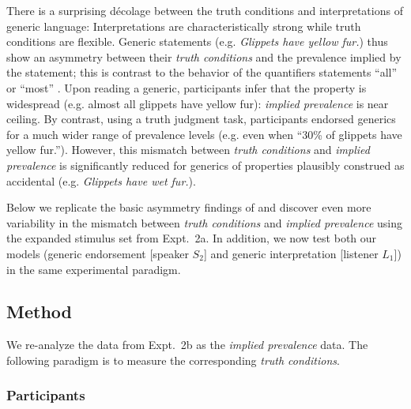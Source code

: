 \documentclass[12pt,letterpaper]{article}
\begin{document}
There is a surprising d\'{e}colage between the truth conditions and interpretations of generic language: Interpretations are characteristically strong while truth conditions are flexible. 
Generic statements (e.g. \emph{Glippets have yellow fur.}) thus show an asymmetry between their \emph{truth conditions} and the prevalence implied by the statement; this is contrast to the behavior of the quantifiers statements ``all'' or ``most'' \cite{Cimpian2010}. 
Upon reading a generic, participants infer that the property is widespread (e.g. almost all glippets have yellow fur): \emph{implied prevalence} is near ceiling.
By contrast, using a truth judgment task, participants endorsed generics for a much wider range of prevalence levels (e.g. even when ``30\% of glippets have yellow fur.''). 
However, this mismatch between \emph{truth conditions} and \emph{implied prevalence} is significantly reduced for generics of properties plausibly construed as accidental (e.g. \emph{Glippets have wet fur.}).


Below we replicate the basic asymmetry findings of  and discover even more variability in the mismatch between \emph{truth conditions} and \emph{implied prevalence} using the expanded stimulus set from Expt.~2a.
In addition, we now test both our models (generic endorsement [speaker $S_2$] and generic interpretation [listener $L_1$]) in the same experimental paradigm. %


\subsection*{Method}

We re-analyze the data from Expt.~2b as the \emph{implied prevalence} data.
The following paradigm is to measure the corresponding \emph{truth conditions}.

\subsubsection*{Participants}
\end{document}
